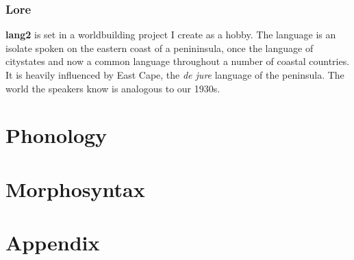 \documentclass[fontsize=12pt,twoside=false,numbers=noenddot]{kaobook}
\newcommand{\langname}{\textbf{lang2}}
\begin{document}
\section{Lore}
\langname{} is set in a worldbuilding project I create as a hobby. The language is an isolate spoken on the eastern coast of a penininsula, once the language of citystates and now a common language throughout a number of coastal countries. It is heavily influenced by East Cape, the \textit{de jure} language of the peninsula. The world the speakers know is analogous to our 1930s.

\mainmatter %

\part{Phonology}



\part{Morphosyntax}











\part{Appendix}

\appendix %



\backmatter %

\end{document}
